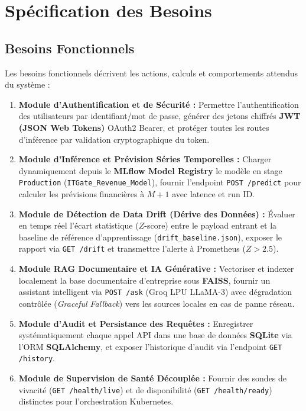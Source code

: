 \documentclass[11pt,a4paper,oneside]{report}
\begin{document}
\section{Spécification des Besoins}

\subsection{Besoins Fonctionnels}
Les besoins fonctionnels décrivent les actions, calculs et comportements attendus du système :

\begin{enumerate}[leftmargin=0.8cm, itemsep=1pt, topsep=1pt]
    \item \textbf{Module d'Authentification et de Sécurité :} Permettre l'authentification des utilisateurs par identifiant/mot de passe, générer des jetons chiffrés \textbf{JWT (JSON Web Tokens)} OAuth2 Bearer, et protéger toutes les routes d'inférence par validation cryptographique du token.
    \item \textbf{Module d'Inférence et Prévision Séries Temporelles :} Charger dynamiquement depuis le \textbf{MLflow Model Registry} le modèle en stage \texttt{Production} (\texttt{ITGate\_Revenue\_Model}), fournir l'endpoint \texttt{POST /predict} pour calculer les prévisions financières à $M+1$ avec latence et run ID.
    \item \textbf{Module de Détection de Data Drift (Dérive des Données) :} Évaluer en temps réel l'écart statistique ($Z$-score) entre le payload entrant et la baseline de référence d'apprentissage (\texttt{drift\_baseline.json}), exposer le rapport via \texttt{GET /drift} et transmettre l'alerte à Prometheus ($Z > 2.5$).
    \item \textbf{Module RAG Documentaire et IA Générative :} Vectoriser et indexer localement la base documentaire d'entreprise sous \textbf{FAISS}, fournir un assistant intelligent via \texttt{POST /ask} (Groq LPU LLaMA-3) avec dégradation contrôlée (\textit{Graceful Fallback}) vers les sources locales en cas de panne réseau.
    \item \textbf{Module d'Audit et Persistance des Requêtes :} Enregistrer systématiquement chaque appel API dans une base de données \textbf{SQLite} via l'ORM \textbf{SQLAlchemy}, et exposer l'historique d'audit via l'endpoint \texttt{GET /history}.
    \item \textbf{Module de Supervision de Santé Découplée :} Fournir des sondes de vivacité (\texttt{GET /health/live}) et de disponibilité (\texttt{GET /health/ready}) distinctes pour l'orchestration Kubernetes.
\end{enumerate}
\end{document}
